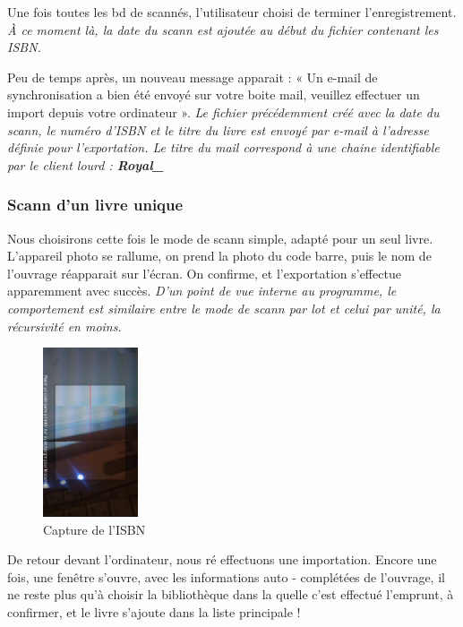 Une fois toutes les bd de scannés, l'utilisateur choisi de terminer l'enregistrement. 
\emph{À ce moment là, la date du scann est ajoutée au début du fichier contenant les ISBN.}

Peu de temps après, un nouveau message apparait : « Un e-mail de synchronisation a bien été envoyé sur votre boite mail, veuillez effectuer un import depuis votre ordinateur ».
\emph{Le fichier précédemment créé avec la date du scann, le numéro d'ISBN et le titre du livre est envoyé par e-mail à l'adresse définie pour l'exportation. 
	Le titre du mail correspond à une chaine identifiable par le client lourd : \textbf{Royal\_}
}

\subsubsection {Scann d'un livre unique}
Nous choisirons cette fois le mode de scann simple, adapté pour un seul livre. 
L'appareil photo se rallume, on prend la photo du code barre, puis le nom de l'ouvrage réapparait sur l'écran.
On confirme, et l'exportation s'effectue apparemment avec succès. 
\emph{D'un point de vue interne au programme, le comportement est similaire entre le mode de scann par lot et celui par unité, la récursivité en moins.}

\begin{figure}
\begin{center}
\includegraphics[height=5cm]{../img/Royal_Scanner_prisescanner_1.png}
\end{center}
\caption{Capture de l'ISBN}
\end{figure}

De retour devant l'ordinateur, nous ré effectuons une importation. 
Encore une fois, une fenêtre s'ouvre, avec les informations auto - complétées de l'ouvrage, il ne reste plus qu'à choisir la bibliothèque dans la quelle c'est effectué l'emprunt, à confirmer, et le livre s'ajoute dans la liste principale !

